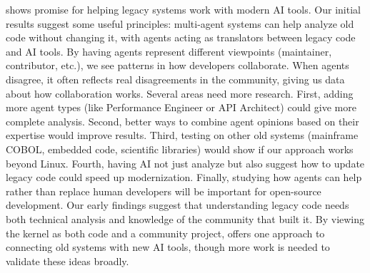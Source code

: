 \sys shows promise for helping legacy systems work with modern AI tools. Our initial results suggest some useful principles: multi-agent systems can help analyze old code without changing it, with agents acting as translators between legacy code and AI tools. By having agents represent different viewpoints (maintainer, contributor, etc.), we see patterns in how developers collaborate. When agents disagree, it often reflects real disagreements in the community, giving us data about how collaboration works. Several areas need more research. First, adding more agent types (like Performance Engineer or API Architect) could give more complete analysis. Second, better ways to combine agent opinions based on their expertise would improve results. Third, testing \sys on other old systems (mainframe COBOL, embedded code, scientific libraries) would show if our approach works beyond Linux. Fourth, having AI not just analyze but also suggest how to update legacy code could speed up modernization. Finally, studying how agents can help rather than replace human developers will be important for open-source development. Our early findings suggest that understanding legacy code needs both technical analysis and knowledge of the community that built it. By viewing the kernel as both code and a community project, \sys offers one approach to connecting old systems with new AI tools, though more work is needed to validate these ideas broadly.

% 
% 